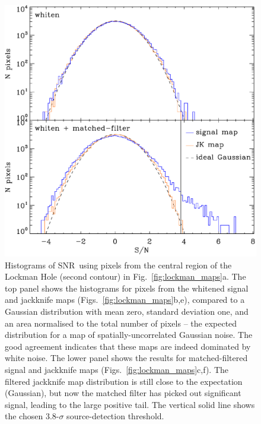 \documentclass[useAMS,usenatbib,nofootinbib]{mn2e}
\newcommand{\snr}{SNR}
\begin{document}
\begin{figure}
\centering
\includegraphics[width=\linewidth]{lockman_hist}
\caption{Histograms of \snr\ using pixels from the central region of
  the Lockman Hole (second contour) in
  Fig.~\ref{fig:lockman_maps}a. The top panel shows the histograms for
  pixels from the whitened signal and jackknife maps
  (Figs.~\ref{fig:lockman_maps}b,e), compared to a Gaussian
  distribution with mean zero, standard deviation one, and an area
  normalised to the total number of pixels -- the expected
  distribution for a map of spatially-uncorrelated Gaussian noise. The
  good agreement indicates that these maps are indeed dominated by
  white noise. The lower panel shows the results for matched-filtered
  signal and jackknife maps (Figs.~\ref{fig:lockman_maps}c,f). The
  filtered jackknife map distribution is still close to the
  expectation (Gaussian), but now the matched filter has picked out
  significant signal, leading to the large positive tail. The vertical
  solid line shows the chosen 3.8-$\sigma$ source-detection
  threshold.}
\label{fig:lockman_hist}
\end{figure}
\end{document}
